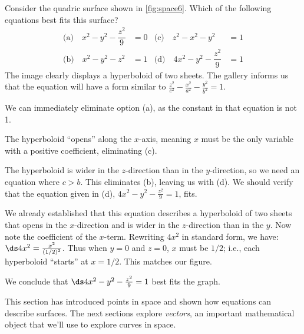 \begin{example}\label{ex_space6}%
Consider the quadric surface shown in \autoref{fig:space6}. Which of the following equations best fits this surface?
\begin{align*}
\text{(a)}\quad x^2-y^2-\dfrac{z^2}{9}&=0 & \text{(c)}\quad z^2-x^2-y^2&=1 \\
\text{(b)}\quad x^2-y^2-z^2&=1 & \text{(d)}\quad 4x^2-y^2-\dfrac{z^2}9&=1
\end{align*}
\solution
The image clearly displays a hyperboloid of two sheets. The gallery informs us that the equation will have a form similar to $\frac{z^2}{c^2}-\frac{x^2}{a^2}-\frac{y^2}{b^2}=1$. 

We can immediately eliminate option (a), as the constant in that equation is not 1.


The hyperboloid ``opens'' along the $x$-axis, meaning $x$ must be the only variable with a  positive coefficient, eliminating (c).

The hyperboloid is wider in the $z$-direction than in the $y$-direction, so we need an equation where $c>b$. This eliminates (b), leaving us with (d). We should verify that the equation given in (d), $4x^2-y^2-\frac{z^2}9=1$, fits.

We already established that this equation describes a hyperboloid of two sheets that opens in the $x$-direction and is wider in the $z$-direction than in the $y$. Now note the coefficient of the $x$-term. Rewriting $4x^2$ in standard form, we have: $\ds 4x^2 = \frac{x^2}{(1/2)^2}$. Thus when $y=0$ and $z=0$, $x$ must be $1/2$; i.e., each hyperboloid ``starts'' at $x=1/2$. This matches our figure.

We conclude that $\ds 4x^2-y^2-\frac{z^2}9=1$ best fits the graph.
\end{example}

This section has introduced points in space and shown how equations can describe surfaces. The next sections explore \emph{vectors}, an important mathematical object that we'll use to explore curves in space.

